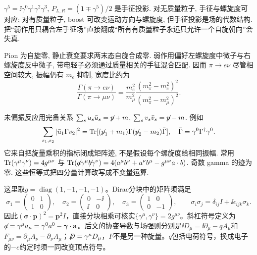 $\gamma^5=\ii\gamma^0\gamma^1\gamma^2\gamma^3$, $P_{L,R}=(1\mp\gamma^5)/2$ 是手征投影. 对无质量粒子, 手征与螺旋度可对应; 对有质量粒子, boost 可改变运动方向与螺旋度, 但手征投影是场的代数结构. 把``弱作用只耦合左手征场''直接翻成``所有有质量粒子永远只允许一个自旋朝向''会失真.

Pion 为自旋零, 静止衰变要求两末态自旋合成零. 弱作用偏好左螺旋度中微子与右螺旋度反中微子, 带电轻子必须通过质量相关的手征混合匹配. 因而 $\pi\to e\nu$ 尽管相空间较大, 振幅仍有 $m_e$ 抑制, 宽度比约为
\begin{equation}
 \frac{\Gamma(\pi\to e\nu)}{\Gamma(\pi\to\mu\nu)}
 =\frac{m_e^2}{m_\mu^2}\frac{(m_\pi^2-m_e^2)^2}{(m_\pi^2-m_\mu^2)^2}.
\end{equation}

未偏振反应用完备关系 $\sum_su_s\bar u_s=\slashed p+m$, $\sum_sv_s\bar v_s=\slashed p-m$. 例如
\begin{equation}
 \sum_{s_1,s_2}|\bar u_1\Gamma v_2|^2
 =\Tr[(\slashed p_1+m_1)\Gamma(\slashed p_2-m_2)\bar\Gamma],
 \quad\bar\Gamma=\gamma^0\Gamma^\dagger\gamma^0.
\end{equation}
它来自把旋量乘积的指标闭成矩阵迹, 不是假设每个螺旋度给相同振幅. 常用 $\Tr(\gamma^\mu\gamma^\nu)=4g^{\mu\nu}$ 与
$\Tr(\slashed a\gamma^\mu\slashed b\gamma^\nu)=4(a^\mu b^\nu+a^\nu b^\mu-g^{\mu\nu}a\cdot b)$. 奇数 gamma 的迹为零. 这些恒等式把四分量计算改写成不变量运算.

这里取$g=\operatorname{diag}(1,-1,-1,-1)$。Dirac分块中的矩阵须满足
\begin{equation}
\sigma_1=\begin{pmatrix}0&1\\1&0\end{pmatrix},\quad
\sigma_2=\begin{pmatrix}0&-\ii\\\ii&0\end{pmatrix},\quad
\sigma_3=\begin{pmatrix}1&0\\0&-1\end{pmatrix},\qquad
\sigma_i\sigma_j=\delta_{ij}I+\ii\epsilon_{ijk}\sigma_k .
\end{equation}
因此$(\boldsymbol\sigma\cdot\mathbf p)^2=\mathbf p^2I$，直接分块相乘可核实$\{\gamma^\mu,\gamma^\nu\}=2g^{\mu\nu}$。斜杠符号定义为$\slashed a=\gamma^\mu a_\mu=\gamma^0a^0-\boldsymbol\gamma\cdot\mathbf a$。后文的协变导数与场强则分别是$\ii D_\mu=\ii\partial_\mu-qA_\mu$和$F_{\mu\nu}=\partial_\mu A_\nu-\partial_\nu A_\mu$；$\slashed D=\gamma^\mu D_\mu$，$F$不是另一种旋量。$q$包括电荷符号，换成电子的$-e$约定时须一同改变顶点符号。

